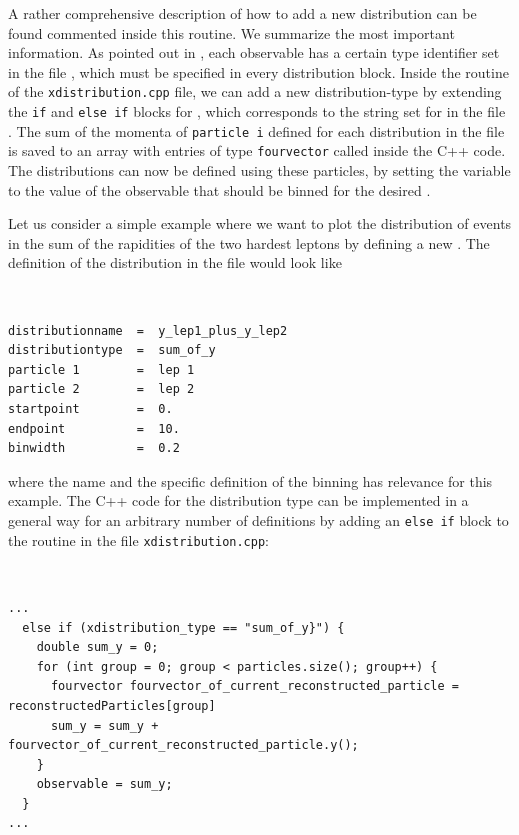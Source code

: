 \documentclass[english,11pt]{article}
\begin{document}
A rather comprehensive description of how to add a new distribution can be found commented inside this routine. We summarize the most 
important information. As pointed out in , each observable has a certain type identifier  
set in the file , which must be specified in every distribution block. Inside the  
routine of the {\tt xdistribution.cpp} file, we can add a new distribution-type by extending the {\tt if} and {\tt else if} blocks for 
, which corresponds to the string set for  in the file .
The sum of the momenta of {\tt particle i} defined for each distribution in the file  is saved to an array with 
entries of type {\tt fourvector} called  inside the C++ code. The distributions can now be defined using these 
particles, by setting the variable  to the value of the 
observable that should be binned for the desired .

Let us consider a simple example where we want to plot the distribution of events in the sum of the rapidities of the two hardest leptons
by defining a new . The definition of the distribution in the file  would look like
{\tt
\begin{lstlisting}[style=InputStyle]
distributionname  =  y_lep1_plus_y_lep2
distributiontype  =  sum_of_y
particle 1        =  lep 1
particle 2        =  lep 2
startpoint        =  0.
endpoint          =  10.
binwidth          =  0.2
\end{lstlisting}
}
where the name and the specific definition of the binning has relevance for this example. The C++ code for the distribution type 
 can be implemented in a general way for an arbitrary number of  definitions by adding an {\tt else if} 
block to the  routine in the file {\tt xdistribution.cpp}:
{\tt
\begin{lstlisting}
...
  else if (xdistribution_type == "sum_of_y}") {
    double sum_y = 0;
    for (int group = 0; group < particles.size(); group++) {
      fourvector fourvector_of_current_reconstructed_particle = reconstructedParticles[group]
      sum_y = sum_y + fourvector_of_current_reconstructed_particle.y();
    }
    observable = sum_y;  
  }     
...
\end{lstlisting}
}
\end{document}
